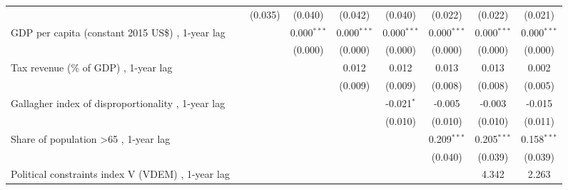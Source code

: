 \begin{table}[htbp]
\begin{tabular}{lcccccccc}
                                                                                                 &         & (0.035)       & (0.040)       & (0.042)       & (0.040)       & (0.022)        & (0.022)        & (0.021)\\   
      GDP per capita (constant 2015 US\$) , 1-year lag                                           &         &               & 0.000$^{***}$ & 0.000$^{***}$ & 0.000$^{***}$ & 0.000$^{***}$  & 0.000$^{***}$  & 0.000$^{***}$\\   
                                                                                                 &         &               & (0.000)       & (0.000)       & (0.000)       & (0.000)        & (0.000)        & (0.000)\\   
      Tax revenue (\% of GDP) , 1-year lag                                                       &         &               &               & 0.012         & 0.012         & 0.013          & 0.013          & 0.002\\   
                                                                                                 &         &               &               & (0.009)       & (0.009)       & (0.008)        & (0.008)        & (0.005)\\   
      Gallagher index of disproportionality , 1-year lag                                         &         &               &               &               & -0.021$^{*}$  & -0.005         & -0.003         & -0.015\\   
                                                                                                 &         &               &               &               & (0.010)       & (0.010)        & (0.010)        & (0.011)\\   
      Share of population >65 , 1-year lag                                                       &         &               &               &               &               & 0.209$^{***}$  & 0.205$^{***}$  & 0.158$^{***}$\\   
                                                                                                 &         &               &               &               &               & (0.040)        & (0.039)        & (0.039)\\   
      Political constraints index V (VDEM) , 1-year lag                                          &         &               &               &               &               &                & 4.342          & 2.263\\   

\end{tabular}
\end{table}
